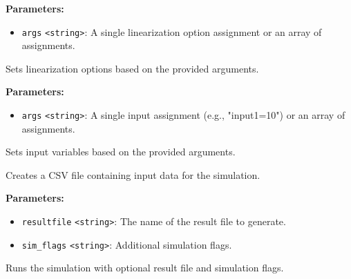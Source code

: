 \documentclass[12pt,a4paper]{article}
\begin{document}
\vspace{5mm}
\noindent {}


\noindent \textbf{Parameters:}
\begin{itemize}
  \item \texttt{args} \texttt{<string>}: A single linearization option assignment or an array of assignments.
\end{itemize}

\noindent Sets linearization options based on the provided arguments.

\vspace{5mm}
\noindent {}


\noindent \textbf{Parameters:}
\begin{itemize}
  \item \texttt{args} \texttt{<string>}: A single input assignment (e.g., "input1=10") or an array of assignments.
\end{itemize}

\noindent Sets input variables based on the provided arguments.

\vspace{5mm}
\noindent {}


\noindent Creates a CSV file containing input data for the simulation.

\vspace{5mm}
\noindent {}


\noindent \textbf{Parameters:}
\begin{itemize}
  \item \texttt{resultfile} \texttt{<string>}: The name of the result file to generate.
  \item \texttt{sim\_flags} \texttt{<string>}: Additional simulation flags.
\end{itemize}

\noindent Runs the simulation with optional result file and simulation flags.
\end{document}
